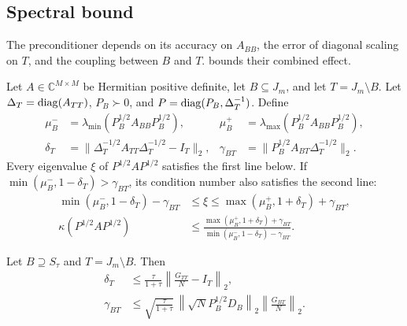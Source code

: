 \subsection{Spectral bound}
\label{subsec:spectral-error-decomposition}

The preconditioner depends on its accuracy on \(A_{BB}\), the error of
diagonal scaling on \(T\), and the coupling between \(B\) and \(T\).
 bounds their combined effect.

\begin{proposition}
\label{prop:active-block-precond}
Let \(A\in\mathbb C^{M\times M}\) be Hermitian positive definite, let
\(B\subseteq J_m\), and let \(T=J_m\setminus B\). Let
\(\Delta_T=\operatorname{diag}(A_{TT})\), \(P_B\succ0\), and
\(P=\operatorname{diag}(P_B,\Delta_T^{-1})\).
Define
\begin{align*}
 \mu_B^-&=\lambda_{\min}(P_B^{1/2}A_{BB}P_B^{1/2}),
 &
 \mu_B^+&=\lambda_{\max}(P_B^{1/2}A_{BB}P_B^{1/2}),\\
 \delta_T&=
 \|\Delta_T^{-1/2}A_{TT}\Delta_T^{-1/2}-I_T\|_2,
 &
 \gamma_{BT}&=
 \|P_B^{1/2}A_{BT}\Delta_T^{-1/2}\|_2.
\end{align*}
Every eigenvalue \(\xi\) of \(P^{1/2}AP^{1/2}\) satisfies the first line
below. If \(\min(\mu_B^-,1-\delta_T)>\gamma_{BT}\), its condition number also
satisfies the second line:
\begin{equation}
\begin{aligned}
\min(\mu_B^-,1-\delta_T)-\gamma_{BT}
&\leq \xi \leq
\max(\mu_B^+,1+\delta_T)+\gamma_{BT},\\
\kappa(P^{1/2}AP^{1/2})
&\leq
\frac{\max(\mu_B^+,1+\delta_T)+\gamma_{BT}}
{\min(\mu_B^-,1-\delta_T)-\gamma_{BT}}.
\end{aligned}
\label{eq:active-box-bound}
\end{equation}

\end{proposition}

\begin{corollary}
\label{cor:fourier-system-bounds}
Let \(B\supseteq S_\tau\) and \(T=J_m\setminus B\). Then
\begin{equation}
\begin{aligned}
\delta_T
&\le
\frac{\tau}{1+\tau}
\left\|
\frac{G_{TT}}{N}-I_T
\right\|_2,
\\
\gamma_{BT}
&\le
\sqrt{\frac{\tau}{1+\tau}}\,
\left\|\sqrt{N}P_B^{1/2}D_B\right\|_2
\left\|\frac{G_{BT}}{N}\right\|_2.
\end{aligned}
\label{eq:fourier-system-bounds}
\end{equation}
\end{corollary}

